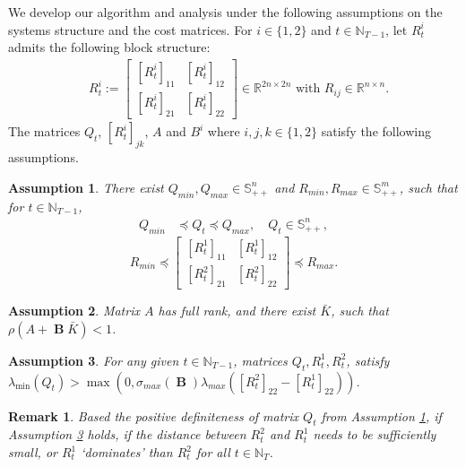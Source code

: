 \documentclass[letterpaper, 10 pt, conference]{ieeeconf}  %
\DeclareMathOperator{\contB}{\mathbf{B}}
\newtheorem{assumption}{Assumption}
\newtheorem{remark}{Remark}
\begin{document}
We develop our algorithm and analysis under the following assumptions on the systems structure and the cost matrices. For $i\in\{1,2\}$ and $t \in \mathbb{N}_{T-1}$, let $R_{t}^{i}$ admits the following block structure:
    \begin{align}
   &R_{t}^{i} := 
   \begin{bmatrix}
       [R_{t}^{i}]_{11} & [R_{t}^{i}]_{12}\\
       [R_{t}^{i}]_{21} & [R_{t}^{i}]_{22}
   \end{bmatrix}\in \mathbb{R}^{2n\times 2n}\text{ with }R_{ij}\in \mathbb{R}^{n\times n}.
   \end{align}
The matrices $Q_{t}$, $[R_{t}^{i}]_{jk}$, $A$ and $B^{i}$ where $i,j,k \in \{1,2\}$ satisfy the following assumptions.
\begin{assumption}\label{assumption:bounds}
    There exist $Q_{min}, Q_{max}\in \mathbb{S}_{++}^{n}$ and $R_{min}, R_{max}\in \mathbb{S}_{++}^{m}$, such that
    for $ t \in \mathbb{N}_{T-1}$,
    \begin{align*}
        Q_{min} &\preceq Q_{t} \preceq Q_{max}, \quad Q_{t} \in \mathbb{S}^{n}_{++},
    \end{align*}
    \begin{equation}\label{eq:positiveR}
        R_{min} \preceq 
        \begin{bmatrix}
            [R_{t}^{1}]_{11} & [R_{t}^{1}]_{12}\\
            [R_{t}^{2}]_{21} & [R_{t}^{2}]_{22}
        \end{bmatrix}
        \preceq R_{max}.
    \end{equation}
\end{assumption}
\begin{assumption}\label{assumption:controllable}
    Matrix $A$ has full rank, and there exist $\bar{K}$, such that $\rho(A + \contB \bar{K}) < 1$.
\end{assumption}
\begin{assumption}\label{assumption:lowerQ}
    For any given $t \in \mathbb{N}_{T-1}$, matrices $Q_{t}, R_{t}^{1}, R_{t}^{2}$,
    satisfy
        $\lambda_{\min}(Q_{t}) > \max(0,\sigma_{max}(\contB)\lambda_{max}([R_{t}^{2}]_{22} - [R_{t}^{1}]_{22}))$.
\end{assumption}
\begin{remark}
    Based the positive definiteness of matrix $Q_{t}$ from Assumption \ref{assumption:bounds}, if Assumption \ref{assumption:lowerQ} holds, if the distance between $R_{t}^{2}$ and $R_{t}^{1}$ needs to be sufficiently small, or $R_{t}^{1}$ `dominates' than $R_{t}^{2}$ for all $t\in \mathbb{N}_{T}$.
\end{remark}
\end{document}
